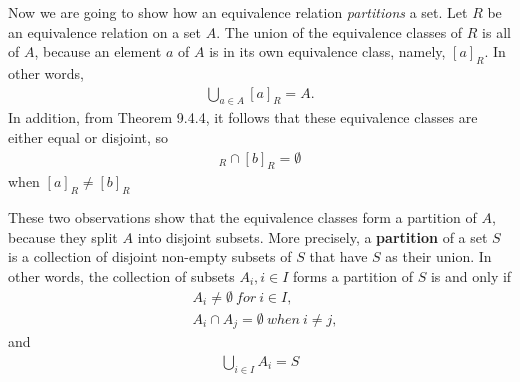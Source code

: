 \documentclass{report}
\begin{document}
Now we are going to show how an equivalence relation \textit{partitions} a set. Let $R$ be an
equivalence relation on a set $A$. The union of the equivalence classes of $R$ is all of $A$, 
because an element $a$ of $A$ is in its own equivalence class, namely, $[a]_R$. In other words,
\begin{align*}
    \bigcup_{a\in A}[a]_R=A.
\end{align*}
In addition, from Theorem 9.4.4, it follows that these equivalence classes are either equal or disjoint, so
\begin{align*}
    [a]_R\cap [b]_R=\emptyset
\end{align*}
when $ [a]_R\neq [b]_R$
\par
These two observations show that the equivalence classes form a partition of $A$, because they
split $A$ into disjoint subsets. More precisely, a \textbf{partition} of a set $S$ is a collection of
disjoint non-empty subsets of $S$ that have $S$ as their union. In other words, the collection of
subsets $A_i,i\in I$ forms a partition of $S$ is and only if
\begin{align*}
    &A_i\neq \emptyset\ for\ i\in I,\\
    &A_i\cap A_j = \emptyset\ when\ i\neq j,
\end{align*}
and
\begin{align*}
    \bigcup_{i\in I}A_i=S
\end{align*}

\end{document}
